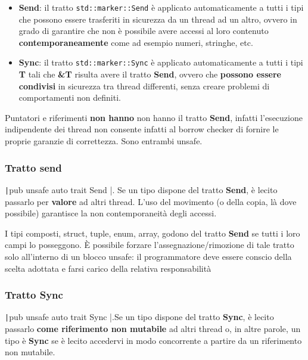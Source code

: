 \begin{itemize}
  \item \textbf{Send}: il tratto \verb|std::marker::Send| è applicato
        automaticamente a tutti i tipi che possono essere trasferiti in sicurezza da
        un thread ad un altro, ovvero in grado di garantire che non è possibile avere
        accessi al loro contenuto \textbf{contemporaneamente} come ad esempio
        numeri, stringhe, etc.
  \item \textbf{Sync}: il tratto \verb|std::marker::Sync| è applicato
        automaticamente a tutti i tipi \textbf{T} tali che \textbf{\&T} risulta avere il tratto \textbf{Send},
        ovvero che \textbf{possono essere condivisi} in sicurezza tra thread differenti, senza
        creare problemi di comportamenti non definiti.
\end{itemize}

Puntatori e riferimenti \textbf{non hanno} non hanno il tratto \textbf{Send}, infatti
l'esecuzione indipendente dei thread non consente infatti al borrow checker di
fornire le proprie garanzie di correttezza.
Sono entrambi unsafe.

\subsubsection{Tratto send}

\texttt|pub unsafe auto trait Send { }|. Se un tipo dispone del tratto
\textbf{Send}, è lecito passarlo per \textbf{valore} ad altri thread.
L'uso del movimento (o della copia, là dove possibile)
garantisce la non contemporaneità degli accessi.

I tipi composti, struct, tuple, enum, array, godono del tratto \textbf{Send} se tutti i
loro campi lo posseggono. È possibile forzare l'assegnazione/rimozione di tale
tratto solo all'interno di un blocco unsafe: il programmatore deve essere
conscio della scelta adottata e farsi carico della relativa responsabilità


\subsubsection{Tratto Sync}

\texttt|pub unsafe auto trait Sync { }|.Se un tipo dispone del tratto
\textbf{Sync}, è lecito passarlo \textbf{come riferimento non mutabile} ad altri thread o, in
altre parole, un tipo è \textbf{Sync} se è lecito accedervi in modo concorrente a partire
da un riferimento non mutabile.

